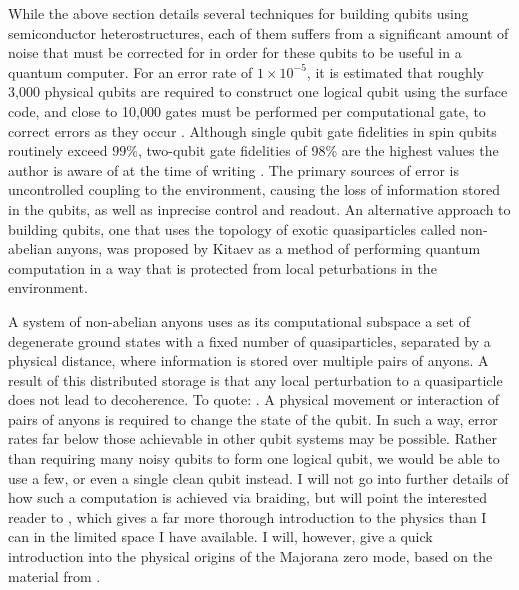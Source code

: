 While the above section details several techniques for building qubits using semiconductor heterostructures,
each of them suffers from a significant amount of noise that must be corrected for in order for these qubits to be useful
in a quantum computer. For an error rate of $1 \times 10^{-5}$, it is estimated that roughly 3,000 physical qubits
are required to construct one logical qubit using the surface code, and close to 10,000 gates must be performed per computational gate, to correct
errors as they occur \cite{6657074}. Although single qubit gate fidelities in spin qubits routinely exceed $99\%$\cite{Zajac439}, two-qubit
gate fidelities of 98\% are the highest values the author is aware of at the time of writing \cite{PhysRevA.99.042310}.
The primary sources of error is uncontrolled coupling to the environment, causing the loss of information stored in the qubits, as well
as inprecise control and readout. An alternative approach to building qubits, one that uses the topology of exotic quasiparticles called non-abelian anyons,
was proposed by Kitaev as a method of performing quantum computation in a way that is protected from local peturbations in the environment\cite{KITAEV20032}.

A system of non-abelian anyons uses as its computational subspace a set of degenerate ground states with a fixed number
of quasiparticles, separated by a physical distance, where information is stored over multiple pairs of anyons. A result of this
distributed storage is that any local perturbation to a quasiparticle does not
lead to decoherence. To quote: . A physical movement or
interaction of pairs of anyons is required to change the state of the qubit. In such a way, error rates
far below those achievable in other qubit systems may be possible. Rather than requiring many noisy qubits to form one logical qubit,
we would be able to use a few, or even a single clean qubit instead. I will not go into further details of how such a computation
is achieved via braiding, but will point the interested reader to \cite{RevModPhys.80.1083}, which
gives a far more thorough introduction to the physics than I can in the limited space I have available. I will, however, give a quick introduction
into the physical origins of the Majorana zero mode, based on the material from \cite{rafael_notes}.


